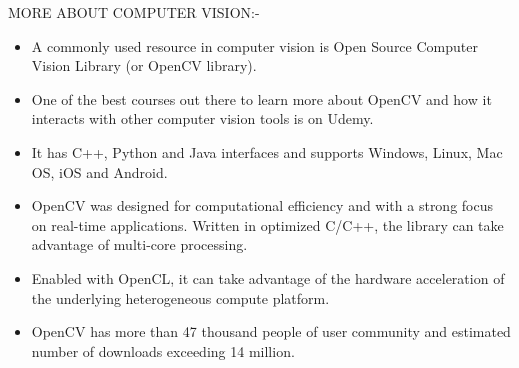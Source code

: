\documentclass{beamer}
\begin{document}
\begin{frame}{MORE ABOUT COMPUTER VISION:-}
\begin{itemize}
\item A commonly used resource in computer vision is Open Source Computer Vision Library (or OpenCV library). 
\item One of the best courses out there to learn more about OpenCV and how it interacts with other computer vision tools is on Udemy. 
\item It has C++, Python and Java interfaces and supports Windows, Linux, Mac OS, iOS and Android. 
\item OpenCV was designed for computational efficiency and with a strong focus on real-time applications. Written in optimized C/C++, the library can take advantage of multi-core processing. 
\item Enabled with OpenCL, it can take advantage of the hardware acceleration of the underlying heterogeneous compute platform.
\item OpenCV has more than 47 thousand people of user community and estimated number of downloads exceeding 14 million.
\end{itemize}

\end{frame}
\end{document}
